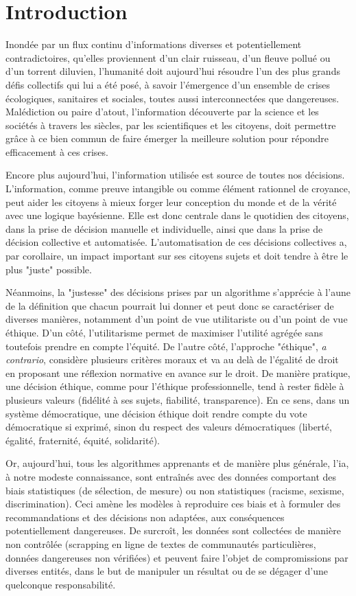 \section{Introduction}

Inondée par un flux continu d'informations diverses et potentiellement contradictoires, qu'elles proviennent d'un clair ruisseau, d'un fleuve pollué ou d'un torrent diluvien, l'humanité doit aujourd'hui résoudre l'un des plus grands défis collectifs qui lui a été posé, à savoir l'émergence d'un ensemble de crises écologiques, sanitaires et sociales, toutes aussi interconnectées que dangereuses. Malédiction ou paire d'atout, l'information découverte par la science et les sociétés à travers les siècles, par les scientifiques et les citoyens, doit permettre grâce à ce bien commun de faire émerger la meilleure solution pour répondre efficacement à ces crises. 

Encore plus aujourd'hui, l'information utilisée est source de toutes nos décisions. L'information, comme preuve intangible ou comme élément rationnel de croyance, peut aider les citoyens à mieux forger leur conception du monde et de la vérité avec une logique bayésienne. Elle est donc centrale dans le quotidien des citoyens, dans la prise de décision manuelle et individuelle, ainsi que dans la prise de décision collective et automatisée. L'automatisation de ces décisions collectives a, par corollaire, un impact important sur ses citoyens sujets et doit tendre à être le plus "juste" possible.

Néanmoins, la "justesse" des décisions prises par un algorithme s'apprécie à l'aune de la définition que chacun pourrait lui donner et peut donc se caractériser de diverses manières, notamment d'un point de vue utilitariste ou d'un point de vue éthique. D'un côté, l'utilitarisme permet de maximiser l'utilité agrégée sans toutefois prendre en compte l'équité. De l'autre côté, l'approche "éthique", \textit{a contrario}, considère plusieurs critères moraux et va au delà de l'égalité de droit en proposant une réflexion normative en avance sur le droit. De manière pratique, une décision éthique, comme pour l'éthique professionnelle, tend à rester fidèle à plusieurs valeurs (fidélité à ses sujets, fiabilité, transparence). En ce sens, dans un système démocratique, une décision éthique doit rendre compte du vote démocratique si exprimé, sinon du respect des valeurs démocratiques (liberté, égalité, fraternité, équité, solidarité).

Or, aujourd'hui, tous les algorithmes apprenants et de manière plus générale, l'\Gls{ia}, à notre modeste connaissance, sont entraînés avec des données comportant des biais statistiques (de sélection, de mesure) ou non statistiques (racisme, sexisme, discrimination). Ceci amène les modèles à reproduire ces biais et à formuler des recommandations et des décisions non adaptées, aux conséquences potentiellement dangereuses. De surcroît, les données sont collectées de manière non contrôlée (scrapping en ligne de textes de communautés particulières, données dangereuses non vérifiées) et peuvent faire l'objet de compromissions par diverses entités, dans le but de manipuler un résultat ou de se dégager d'une quelconque responsabilité.

